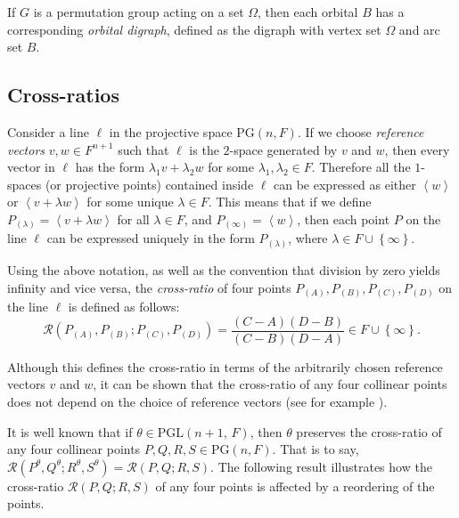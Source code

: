 \documentclass[10pt]{amsart}
\theoremstyle{definition}
\theoremstyle{plain}
\theoremstyle{plain}
\theoremstyle{plain}
\theoremstyle{plain}
\newcommand{\PG}{\mathrm{PG}}
\newcommand{\PGL}{\mathrm{PGL}}
\begin{document}
If $G$ is a permutation group acting on a set $\Omega$, then each orbital $B$ has a corresponding \emph{orbital digraph}, defined as the digraph with vertex set $\Omega$ and arc set $B$.

\subsection{Cross-ratios}

Consider a line $\ell$ in the projective space $\PG(n, F)$. If we choose \emph{reference vectors} $v, w \in F^{n+1}$ such that $\ell$ is the $2$-space generated by $v$ and $w$, then every vector in $\ell$ has the form $\lambda_1 v + \lambda_2 w$ for some $\lambda_1, \lambda_2 \in F$. Therefore all the $1$-spaces (or projective points) contained inside $\ell$ can be expressed as either $\left<w \right>$ or $\left<v + \lambda w \right>$ for some unique $\lambda \in F$. This means that if we define $P_{\left(\lambda \right)} = \left<v + \lambda w \right>$ for all $\lambda \in F$, and $P_{\left(\infty \right)} = \left<w \right>$, then each point $P$ on the line $\ell$ can be expressed uniquely in the form $P_{\left(\lambda \right)}$, where $\lambda \in F \cup \left\{\infty \right\}$.

Using the above notation, as well as the convention that division by zero yields infinity and vice versa, the \emph{cross-ratio} of four points $P_{\left(A \right)}, P_{\left(B \right)}, P_{\left(C \right)}, P_{\left(D \right)}$ on the line $\ell$ is defined as follows:
\begin{displaymath}
\mathcal{R} {\left(P_{\left(A \right)}, P_{\left(B \right)}; P_{\left(C \right)}, P_{\left(D \right)}\right)} = \frac{\left(C-A \right) \left(D-B \right)}{\left(C-B \right) \left(D-A \right)} \in F \cup \left\{\infty \right\}.
\end{displaymath}

Although this defines the cross-ratio in terms of the arbitrarily chosen reference vectors $v$ and $w$, it can be shown that the cross-ratio of any four collinear points does not depend on the choice of reference vectors (see for example \cite[Section 3.5, Theorem 1]{ref:garner-projective}).

It is well known that if $\theta \in \PGL{\left(n+1,\, F \right)}$, then $\theta$ preserves the cross-ratio of any four collinear points $P, Q, R, S \in \PG{\left(n, F \right)}$. That is to say, $\mathcal{R}{\left(P^\theta, Q^\theta; R^\theta, S^\theta \right)} = \mathcal{R}{\left(P, Q; R, S \right)}$. The following result \cite[Lemma 4.4]{ref:bamberg-analytic} illustrates how the cross-ratio $\mathcal{R} {\left(P, Q; R, S \right)}$ of any four points is affected by a reordering of the points.
\end{document}

